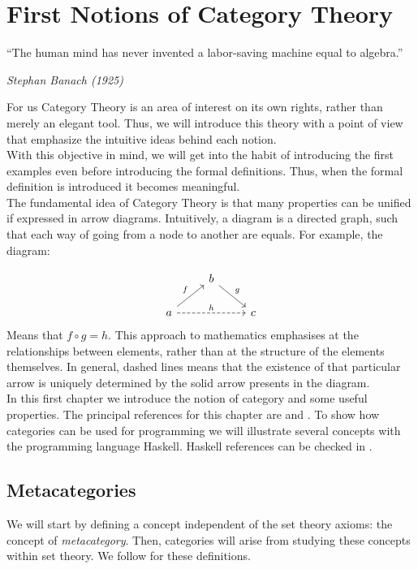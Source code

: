 



\chapter{First Notions of Category Theory}
\thispagestyle{empty}
\epigraph{“The human mind has never invented a labor-saving machine equal to algebra.” }{\textit{Stephan Banach (1925)}}

For us Category Theory is an area of interest on its own rights, rather than merely an elegant tool. Thus, we will introduce this theory with a point of view that emphasize the intuitive ideas behind each notion.\\

With this objective in mind, we will get into the habit of introducing the first examples even before introducing the formal definitions. Thus, when the formal definition is introduced it becomes meaningful.\\

The fundamental idea of Category Theory is that many properties can be unified if expressed in arrow diagrams. Intuitively, a diagram is a directed graph, such that each way of going from a node to another are equals. For example, the diagram:

\[
  \begin{tikzcd}
    & b \arrow[rd, "g"]& \\
    a\arrow[ru, "f"] \arrow[rr, "h", dashed] && c
  \end{tikzcd}
\]
Means that $f\circ g = h$. This approach to mathematics emphasises  at the relationships between elements, rather than at the structure of the elements themselves. In general, dashed lines means that the existence of that particular arrow is uniquely determined by the solid arrow presents in the diagram.\\

In this first chapter we introduce the notion of category and some useful properties. The principal references for this chapter are \cite{mac2013categories} and \cite{riehl2017category}. To show how categories can be used for programming we will illustrate several concepts with the programming language Haskell. Haskell references can be checked in \cite{milewski2018category}.

\section{Metacategories}
We will start by defining a concept independent of the set theory axioms: the concept of \emph{metacategory}. Then, categories will arise from studying these concepts within set theory. We follow  \cite{mac2013categories} for these definitions.\\


